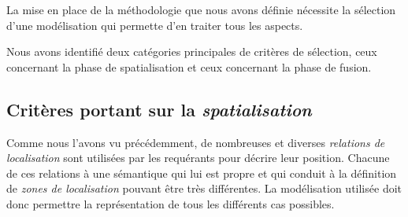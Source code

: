 La mise en place de la méthodologie que nous avons définie nécessite
la sélection d'une modélisation qui permette d'en traiter tous les
aspects.

Nous avons identifié deux catégories principales de critères de
sélection, ceux concernant la phase de spatialisation et ceux
concernant la phase de fusion.

\subsection{Critères portant sur la \emph{spatialisation}}

Comme nous l'avons vu précédemment, de nombreuses et diverses
\emph{relations de localisation} sont utilisées par les requérants
pour décrire leur position. Chacune de ces relations à une sémantique
qui lui est propre et qui conduit à la définition de \emph{zones de
  localisation} pouvant être très différentes. La modélisation
utilisée doit donc permettre la représentation de tous les différents
cas possibles.


